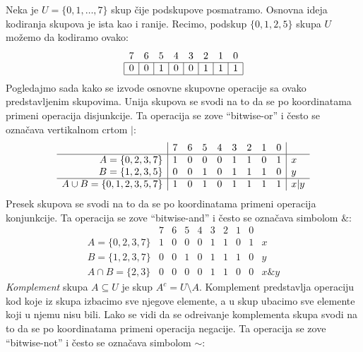 Neka je $U = \{0, 1, \ldots, 7\}$ skup \v cije podskupove posmatramo.
Osnovna ideja kodiranja skupova je ista kao i ranije. Recimo, podskup $\{0, 1, 2, 5\}$ skupa $U$ mo\v zemo da kodiramo ovako:
$$
    \begin{array}{cccccccc}
      \small 7 & \small 6 & \small 5 & \small 4 & \small 3 & \small 2 & \small 1 & \small 0 \\
      \hline
      \multicolumn{1}{|c}{0}&\multicolumn{1}{|c}{0}&\multicolumn{1}{|c}{1}&\multicolumn{1}{|c}{0}&\multicolumn{1}{|c}{0}&\multicolumn{1}{|c}{1}&\multicolumn{1}{|c}{1}&\multicolumn{1}{|c|}{1}\\
      \hline
    \end{array}
$$
Pogledajmo sada kako se izvode osnovne skupovne operacije sa ovako pred\-stav\-ljenim skupovima. Unija skupova se svodi na to
da se po koordinatama primeni operacija disjunkcije. Ta operacija se zove \enquote{bitwise-or} i \v cesto se ozna\v cava vertikalnom crtom $|$:
$$
  \begin{array}{r|cccccccc|l}
                                    & 7 & 6 & 5 & 4 & 3 & 2 & 1 & 0 \\ \hline
  A = \{0, 2, 3, 7\}                & 1 & 0 & 0 & 0 & 1 & 1 & 0 & 1 & x\\
  B = \{1, 2, 3, 5\}                & 0 & 0 & 1 & 0 & 1 & 1 & 1 & 0 & y\\ \hline
  A \cup B = \{0, 1, 2, 3, 5, 7\} & 1 & 0 & 1 & 0 & 1 & 1 & 1 & 1 & x|y
  \end{array}
$$
Presek skupova se svodi na to
da se po koordinatama primeni operacija konjunkcije. Ta operacija se zove \enquote{bitwise-and} i \v cesto se ozna\v cava simbolom $\&$:
$$
  \begin{array}{r|cccccccc|l}
                           & 7 & 6 & 5 & 4 & 3 & 2 & 1 & 0 \\ \hline
  A = \{0, 2, 3, 7\}       & 1 & 0 & 0 & 0 & 1 & 1 & 0 & 1 & x\\
  B = \{1, 2, 3, 7\}       & 0 & 0 & 1 & 0 & 1 & 1 & 1 & 0 & y\\ \hline
  A \cap B = \{2,3\}       & 0 & 0 & 0 & 0 & 1 & 1 & 0 & 0 & x\&y
  \end{array}
$$
\emph{Komplement} skupa $A \subseteq U$ je skup $A^c = U \setminus A$. Komplement predstavlja operaciju
kod koje iz skupa izbacimo sve njegove elemente, a u skup ubacimo sve elemente koji u njemu
nisu bili. Lako se vidi da se odre\dj ivanje komplementa skupa svodi na to
da se po koordinatama primeni operacija negacije. Ta operacija se zove \enquote{bitwise-not} i \v cesto se ozna\v cava simbolom $\sim$:
